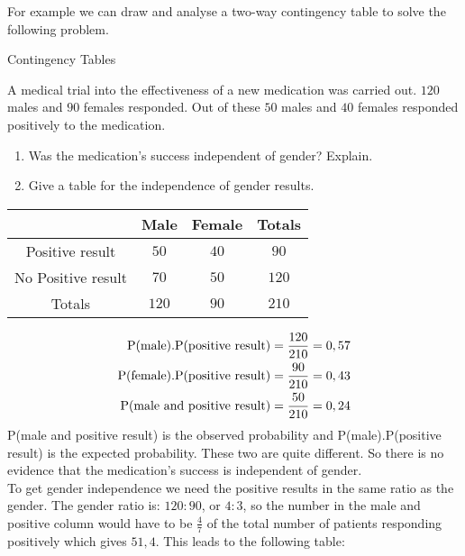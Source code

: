 
For example we can draw and analyse a two-way contingency table to solve the following problem.
\begin{wex}{Contingency Tables}
{A medical trial into the effectiveness of a new medication was carried out. $120$ males and $90$ females responded. Out of these $50$ males and $40$ females responded positively to the medication. 
\begin{enumerate}
\item Was the medication's success independent of gender? Explain.
\item Give a table for the independence of gender results.
\end{enumerate}}
{
\begin{center}
\begin{tabular}{|c|c|c|c|}
\hline
                   & Male & Female & Totals \\
\hline
Positive result    & $50$   & $40  $   & $90   $  \\
No Positive result & $70  $ & $50 $    & $120 $   \\
\hline
Totals             & $120$  & $90$     & $210$    \\
\hline
\end{tabular}
\end{center}
\begin{align*}
\text{P(male).P(positive result)} =\frac{120}{210}=0,57\\
\newline
\text{P(female).P(positive result)} =\frac{90}{210}=0,43\\
\newline
\text{P(male and positive result)} =\frac{50}{210}=0,24
\end{align*}
P(male and positive result) is the observed probability and P(male).P(positive result) is the expected probability. These two are quite different. So there is no evidence that the medication's success is independent of gender.\\
To get gender independence we need the positive results in the same ratio as the gender. The gender ratio is: $120:90$, or $4:3$, so the number in the male and positive column would have to be $\frac{4}{7}$ of the total number of patients responding positively which gives $51,4$. This leads to the following table:
}
\end{wex}
